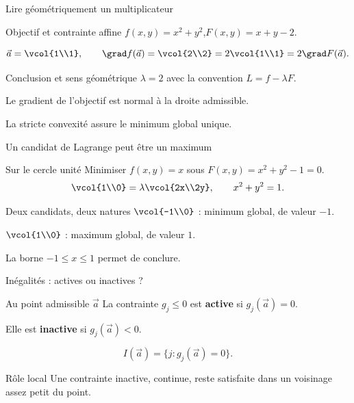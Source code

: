 \begin{frame}[t]{Lire géométriquement un multiplicateur}
\coursanalyse
\begin{exemple}{Objectif et contrainte affine}
$f(x,y)=x^2+y^2$,\quad $F(x,y)=x+y-2$.
\end{exemple}
\[\vec a=\vcol{1\\1},\qquad \grad f(\vec a)=\vcol{2\\2}=2\vcol{1\\1}=2\grad F(\vec a).\]
\begin{resultat}{Conclusion et sens géométrique}
$\lambda=2$ avec la convention $L=f-\lambda F$.
\par Le gradient de l’objectif est normal à la droite admissible.
\par La stricte convexité assure le minimum global unique.
\end{resultat}
\end{frame}

\begin{frame}[t]{Un candidat de Lagrange peut être un maximum}
\coursanalyse
\begin{exemple}{Sur le cercle unité}
Minimiser $f(x,y)=x$ sous $F(x,y)=x^2+y^2-1=0$.
\[\vcol{1\\0}=\lambda\vcol{2x\\2y},\qquad x^2+y^2=1.\]
\end{exemple}
\begin{cours}{Deux candidats, deux natures}
$\vcol{-1\\0}$ : minimum global, de valeur $-1$.
\smallskip\par $\vcol{1\\0}$ : maximum global, de valeur $1$.
\end{cours}La borne $-1\le x\le1$ permet de conclure.
\end{frame}

\begin{frame}[t]{Inégalités : actives ou inactives ?}
\coursanalyse
\begin{notion}{Au point admissible $\vec a$}
La contrainte $g_j\le0$ est \textbf{active} si $g_j(\vec a)=0$.
\medskip\par Elle est \textbf{inactive} si $g_j(\vec a)<0$.
\end{notion}
\[I(\vec a)=\{j:g_j(\vec a)=0\}.\]
\begin{resultat}{Rôle local}
Une contrainte inactive, continue, reste satisfaite dans un voisinage assez petit du point.
\end{resultat}
\end{frame}

